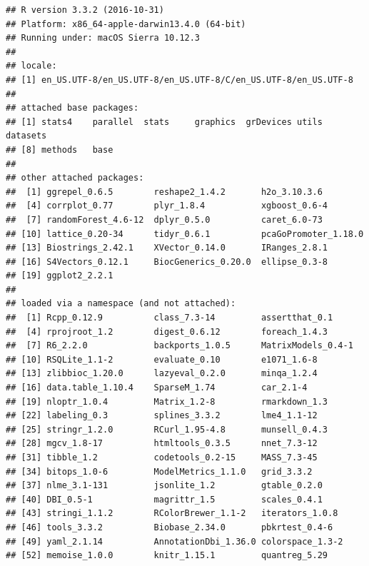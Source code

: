 \documentclass[]{article}
\begin{document}
\begin{verbatim}
## R version 3.3.2 (2016-10-31)
## Platform: x86_64-apple-darwin13.4.0 (64-bit)
## Running under: macOS Sierra 10.12.3
## 
## locale:
## [1] en_US.UTF-8/en_US.UTF-8/en_US.UTF-8/C/en_US.UTF-8/en_US.UTF-8
## 
## attached base packages:
## [1] stats4    parallel  stats     graphics  grDevices utils     datasets 
## [8] methods   base     
## 
## other attached packages:
##  [1] ggrepel_0.6.5        reshape2_1.4.2       h2o_3.10.3.6        
##  [4] corrplot_0.77        plyr_1.8.4           xgboost_0.6-4       
##  [7] randomForest_4.6-12  dplyr_0.5.0          caret_6.0-73        
## [10] lattice_0.20-34      tidyr_0.6.1          pcaGoPromoter_1.18.0
## [13] Biostrings_2.42.1    XVector_0.14.0       IRanges_2.8.1       
## [16] S4Vectors_0.12.1     BiocGenerics_0.20.0  ellipse_0.3-8       
## [19] ggplot2_2.2.1       
## 
## loaded via a namespace (and not attached):
##  [1] Rcpp_0.12.9          class_7.3-14         assertthat_0.1      
##  [4] rprojroot_1.2        digest_0.6.12        foreach_1.4.3       
##  [7] R6_2.2.0             backports_1.0.5      MatrixModels_0.4-1  
## [10] RSQLite_1.1-2        evaluate_0.10        e1071_1.6-8         
## [13] zlibbioc_1.20.0      lazyeval_0.2.0       minqa_1.2.4         
## [16] data.table_1.10.4    SparseM_1.74         car_2.1-4           
## [19] nloptr_1.0.4         Matrix_1.2-8         rmarkdown_1.3       
## [22] labeling_0.3         splines_3.3.2        lme4_1.1-12         
## [25] stringr_1.2.0        RCurl_1.95-4.8       munsell_0.4.3       
## [28] mgcv_1.8-17          htmltools_0.3.5      nnet_7.3-12         
## [31] tibble_1.2           codetools_0.2-15     MASS_7.3-45         
## [34] bitops_1.0-6         ModelMetrics_1.1.0   grid_3.3.2          
## [37] nlme_3.1-131         jsonlite_1.2         gtable_0.2.0        
## [40] DBI_0.5-1            magrittr_1.5         scales_0.4.1        
## [43] stringi_1.1.2        RColorBrewer_1.1-2   iterators_1.0.8     
## [46] tools_3.3.2          Biobase_2.34.0       pbkrtest_0.4-6      
## [49] yaml_2.1.14          AnnotationDbi_1.36.0 colorspace_1.3-2    
## [52] memoise_1.0.0        knitr_1.15.1         quantreg_5.29
\end{verbatim}
\end{document}
